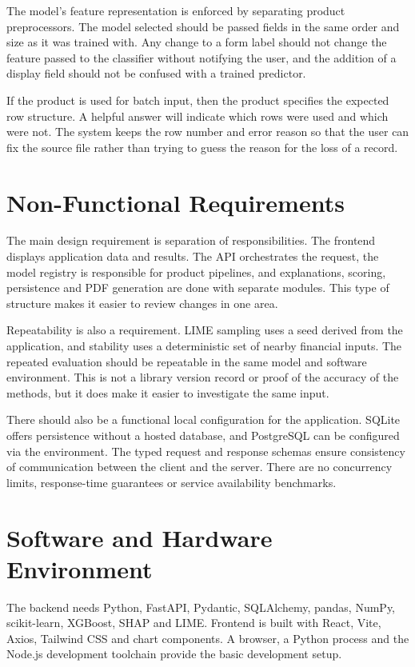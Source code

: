 The model's feature representation is enforced by separating product preprocessors. The model selected should be passed fields in the same order and size as it was trained with. Any change to a form label should not change the feature passed to the classifier without notifying the user, and the addition of a display field should not be confused with a trained predictor.

If the product is used for batch input, then the product specifies the expected row structure. A helpful answer will indicate which rows were used and which were not. The system keeps the row number and error reason so that the user can fix the source file rather than trying to guess the reason for the loss of a record.

\section{Non-Functional Requirements}
The main design requirement is separation of responsibilities. The frontend displays application data and results. The API orchestrates the request, the model registry is responsible for product pipelines, and explanations, scoring, persistence and PDF generation are done with separate modules. This type of structure makes it easier to review changes in one area.

Repeatability is also a requirement. LIME sampling uses a seed derived from the application, and stability uses a deterministic set of nearby financial inputs. The repeated evaluation should be repeatable in the same model and software environment. This is not a library version record or proof of the accuracy of the methods, but it does make it easier to investigate the same input.

There should also be a functional local configuration for the application. SQLite offers persistence without a hosted database, and PostgreSQL can be configured via the environment. The typed request and response schemas ensure consistency of communication between the client and the server. There are no concurrency limits, response-time guarantees or service availability benchmarks.

\section{Software and Hardware Environment}
The backend needs Python, FastAPI, Pydantic, SQLAlchemy, pandas, NumPy, scikit-learn, XGBoost, SHAP and LIME. Frontend is built with React, Vite, Axios, Tailwind CSS and chart components. A browser, a Python process and the Node.js development toolchain provide the basic development setup.

